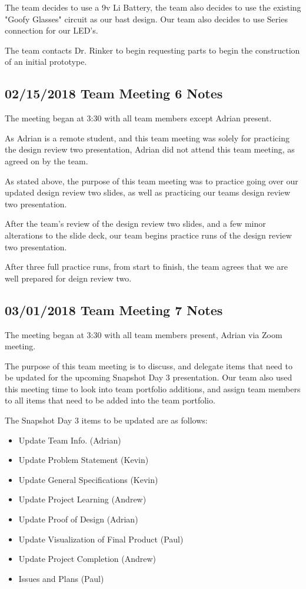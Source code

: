 \documentclass[12pt]{article}
\begin{document}
	\noindent
	The team decides to use a 9v Li Battery, the team also decides to use the existing "Goofy Glasses" circuit as our bast design. Our team also decides to use Series connection for our LED's. 
	
	\noindent
	The team contacts Dr. Rinker to begin requesting parts to begin the construction of an initial prototype.
	
	\clearpage
	
	\subsection{02/15/2018 Team Meeting 6 Notes}
	The meeting began at 3:30 with all team members except Adrian present.
	
	\noindent
	As Adrian is a remote student, and this team meeting was solely for practicing 			the design review two presentation, Adrian did not attend this team meeting, as 		agreed on by the team.
	
	\noindent
	As stated above, the purpose of this team meeting was to practice going over our 		updated design review two slides, as well as practicing our teams design review 		two presentation.
	
	\noindent
	After the team's review of the design review two slides, and a few minor 				alterations to the slide deck, our team begins practice runs of the design review 	two presentation.
	
	\noindent
	After three full practice runs, from start to finish, the team agrees that we are 	well prepared for deign review two.
	
	\clearpage
	
	\subsection{03/01/2018 Team Meeting 7 Notes}
	The meeting began at 3:30 with all team members present, Adrian via Zoom meeting.
	
	\noindent
	The purpose of this team meeting is to discuss, and delegate items that need to 		be updated for the upcoming Snapshot Day 3 presentation. Our team also used this 		meeting time to look into team portfolio additions, and assign team members to 			all items that need to be added into the team portfolio.
	
	\noindent
	The Snapshot Day 3 items to be updated are as follows:
	\begin{itemize}
	\item Update Team Info. (Adrian)
	\item Update Problem Statement (Kevin)
	\item Update General Specifications (Kevin)
	\item Update Project Learning (Andrew)
	\item Update Proof of Design (Adrian)
	\item Update Visualization of Final Product (Paul)
	\item Update Project Completion (Andrew)
	\item Issues and Plans (Paul)
	\end{itemize}
	
\end{document}
